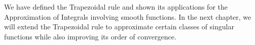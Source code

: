 \documentclass[../document.tex]{subfiles}
\begin{document}
	
	We have defined the Trapezoidal rule and shown its applications for the Approximation of  Integrals involving smooth functions. In the next chapter, we will extend the Trapezoidal rule to approximate certain classes of singular functions while also improving its order of convergence.
	
	
	
	
	
\end{document}
